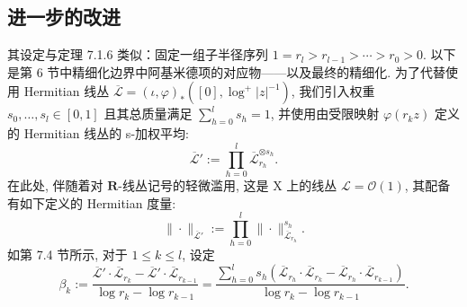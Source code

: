 \subsection{进一步的改进}\label{sec:7.6}

其设定与定理 7.1.6 类似：固定一组子半径序列 \(1 = r_l > r_{l-1} > \cdots > r_0 > 0\). 
以下是第 6 节中精细化边界中阿基米德项的对应物——以及最终的精细化. 
为了代替使用 Hermitian 线丛 \(\overline{\mathcal{L}} = (\iota, \varphi)_*([0], \log^+ |z|^{-1})\), 
我们引入权重 \(s_0, \ldots, s_l \in [0, 1]\) 且其总质量满足 \(\sum_{h=0}^l s_h = 1\), 
并使用由受限映射 \(\varphi(r_k z)\) 定义的 Hermitian 线丛的 s-加权平均:
\[ \overline{\mathcal{L}}' := \prod_{h=0}^{l} \overline{\mathcal{L}}_{r_h}^{\otimes s_h}. \]
在此处, 伴随着对 \(\mathbf{R}\)-线丛记号的轻微滥用, 这是 X 上的线丛 \(\mathcal{L} = \mathcal{O}(1)\), 
其配备有如下定义的 Hermitian 度量:
\[ \|\cdot\|_{\overline{\mathcal{L}}'}:=\prod_{h=0}^l\|\cdot\|_{\overline{\mathcal{L}}_{r_h}}^{s_h}. \]
如第 7.4 节所示, 对于 \(1 \le k \le l\), 设定
\begin{equation}\label{eq:7.6.1}
\beta_k := \frac{\overline{\mathcal{L}}' \cdot \overline{\mathcal{L}}_{r_k} - \overline{\mathcal{L}}' \cdot \overline{\mathcal{L}}_{r_{k-1}}}{\log r_k - \log r_{k-1}} = \frac{\sum_{h=0}^l s_h(\overline{\mathcal{L}}_{r_h} \cdot \overline{\mathcal{L}}_{r_k} - \overline{\mathcal{L}}_{r_h} \cdot \overline{\mathcal{L}}_{r_{k-1}})}{\log r_k - \log r_{k-1}}.
\end{equation}

